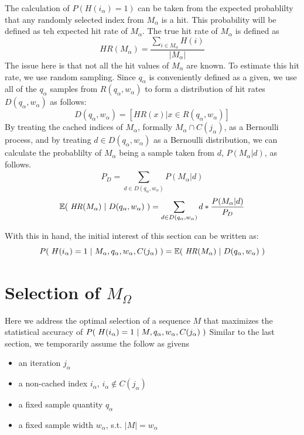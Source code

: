 \documentclass{article}
\def\expected{\mathbb{E}}
\def\s{\hspace{0.3em}}
\newcommand{\br}{ \hfill \break}
\begin{document}
\begin{adjustwidth}{2.5em}{0pt}
        \br
        The calculation of $P( H(i_\alpha) = 1 )$ can be taken from the expected probablilty that any randomly selected index from $M_\alpha$ is a hit.
        This probability will be defined as teh expected hit rate of $M_\alpha$. The true hit rate of $M_\alpha$ is defined as
        $$ \mathit{HR}(M_\alpha) = \displaystyle\frac{\displaystyle\sum_{i \in M_\alpha}^{} H(i) }{|M_\alpha|} $$
        The issue here is that not all the hit values of $M_\alpha$ are known. To estimate this hit rate, we use random sampling.
        Since $q_\alpha$ is conveniently defined as a given, we use all of the $q_\alpha$ samples from $R(q_\alpha, w_\alpha)$ to form a distribution of hit rates $D(q_\alpha, w_\alpha)$ as follows:
        $$ D(q_\alpha, w_\alpha) = [ \mathit{HR}(x) | x \in R(q_\alpha, w_\alpha) ] $$
        By treating the cached indices of $M_\alpha$, formally $M_\alpha \cap C(j_\alpha)$, as a Bernoulli process,
        and by treating $d \in D(q_\alpha, w_\alpha)$ as a Bernoulli distribution, we can calculate the probablilty of $M_\alpha$ being a sample taken from $d$, $P(M_\alpha | d)$, as follows.
        $$ P_D = \displaystyle\sum_{d \in D(q_\alpha, w_\alpha)}^{} P(M_\alpha | d) $$
        $$ \expected(\s    \mathit{HR}(M_\alpha)    \s|\s     D(q_\alpha, w_\alpha)    \s) =  \displaystyle\sum_{d \in D(q_\alpha, w_\alpha)}^{} d * \displaystyle\frac{P(M_\alpha | d)}{P_D}  $$
        
        With this in hand, the initial interest of this section can be written as:
        $$ P( \s H(i_\alpha) = 1 \s|\s M_\alpha, q_\alpha, w_\alpha, C(j_\alpha) \s) = \expected(\s    \mathit{HR}(M_\alpha)    \s|\s    D(q_\alpha, w_\alpha)    \s) $$
    \section{Selection of $M_\Omega$}
        Here we address the optimal selection of a sequence $M$ that maximizes the statistical accuracy of $P(\s H(i_\alpha) = 1 \s|\s M, q_\alpha, w_\alpha, C(j_\alpha) \s)$
        \br\br
        Similar to the last section, we temporarily assume the follow as givens
        \begin{itemize}
            \item an iteration $j_\alpha$
            \item a non-cached index $i_\alpha$, $i_\alpha \notin C(j_\alpha)$
            \item a fixed sample quantity $q_\alpha$
            \item a fixed sample width $w_\alpha$, s.t. $|M| = w_\alpha$
        \end{itemize}
        

\end{adjustwidth}
\end{document}
